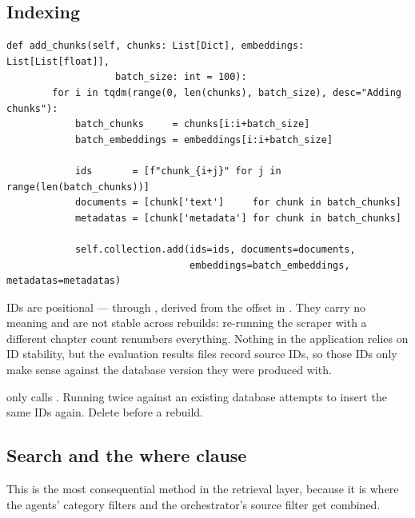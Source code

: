 \subsection{Indexing}

\begin{lstlisting}[style=py,firstnumber=21]
    def add_chunks(self, chunks: List[Dict], embeddings: List[List[float]],
                   batch_size: int = 100):
        for i in tqdm(range(0, len(chunks), batch_size), desc="Adding chunks"):
            batch_chunks     = chunks[i:i+batch_size]
            batch_embeddings = embeddings[i:i+batch_size]

            ids       = [f"chunk_{i+j}" for j in range(len(batch_chunks))]
            documents = [chunk['text']     for chunk in batch_chunks]
            metadatas = [chunk['metadata'] for chunk in batch_chunks]

            self.collection.add(ids=ids, documents=documents,
                                embeddings=batch_embeddings, metadatas=metadatas)
\end{lstlisting}

IDs are positional ---  through , derived from the offset in . They carry no meaning and are not stable across rebuilds: re-running the scraper with a different chapter count renumbers everything. Nothing in the application relies on ID stability, but the evaluation results files record source IDs, so those IDs only make sense against the database version they were produced with.

\begin{warn}[title={Re-indexing does not clear the collection}]
 only calls . Running  twice against an existing database attempts to insert the same IDs again. Delete  before a rebuild.
\end{warn}

\subsection{Search and the where clause}

This is the most consequential method in the retrieval layer, because it is where the agents' category filters and the orchestrator's source filter get combined.


